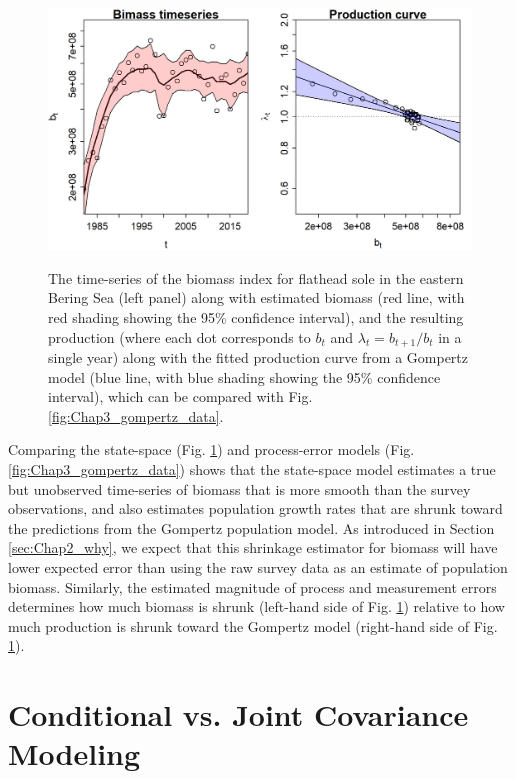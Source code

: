 \begin{figure}[!ht]
    \caption[Biomass estimated using conditional autoregressive model]{The time-series of the biomass index for flathead sole in the eastern Bering Sea (left panel) along with estimated biomass (red line, with red shading showing the 95\% confidence interval), and the resulting production (where each dot corresponds to \(b_t\) and \(\lambda_t = b_{t+1}/b_t\) in a single year) along with the fitted production curve from a Gompertz model (blue line, with blue shading showing the 95\% confidence interval), which can be compared with Fig. \ref{fig:Chap3_gompertz_data}.}
    \centering
    \includegraphics[width=5.5in]{Chap_3/gompertz_fit.png}
    \label{fig:Chap3_gompertz_conditional}
\end{figure}

Comparing the state-space (Fig. \ref{fig:Chap3_gompertz_conditional}) and process-error 
models (Fig. \ref{fig:Chap3_gompertz_data}) shows that the state-space model estimates a true but unobserved time-series of biomass that is more smooth than the survey observations, and also estimates population growth rates that are shrunk toward the predictions from the Gompertz population model.  As introduced in Section \ref{sec:Chap2_why}, we expect that this shrinkage estimator for biomass will have lower expected error than using the raw survey data as an estimate of population biomass.  Similarly, the estimated magnitude of process and measurement errors determines how much biomass is shrunk (left-hand side of Fig. \ref{fig:Chap3_gompertz_conditional}) relative to how much production is shrunk toward the Gompertz model (right-hand side of Fig. \ref{fig:Chap3_gompertz_conditional}).  

\section{Conditional vs. Joint Covariance Modeling} \label{sec:Chap3_joint_Gompertz}

